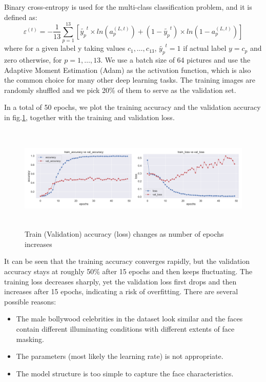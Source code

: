 Binary cross-entropy is used for the multi-class classification problem, and it is defined as:
\begin{equation}
    \varepsilon^{(t)} = -\frac{1}{13}\sum_{p=1}^{13}\left[  \tilde{y_p}^{t} \times ln(a_p^{(L,t)}) + (1-\tilde{y_p}^{t}) \times ln(1-a_p^{(L,t)}) \right]
\end{equation}
where for a given label y taking values $c_1,\dots, c_{13}$, $\tilde{y_p}^{t}=1$ if actual label $y=c_p$ and zero otherwise, for $p=1,\dots , 13$. We use a batch size of 64 pictures and use the Adaptive Moment Estimation (Adam) as the activation function, which is also the common choice for many other deep learning tasks. The training images are randomly shuffled and we pick 20\% of them to serve as the validation set.

In a total of 50 epochs, we plot the training accuracy and the validation accuracy in fig.\ref{pic:cnn1}, together with the training and validation loss. 
\begin{figure}[!htbp]
    \centering\includegraphics[width=16cm, height=5cm]{./figures/cnn1.png}
    \caption{Train (Validation) accuracy (loss) changes as number of epochs increases}
    \label{pic:cnn1}
\end{figure}
It can be seen that the training accuracy converges rapidly, but the validation accuracy stays at roughly 50\% after 15 epochs and then keeps fluctuating. The training loss decreases sharply, yet the validation loss first drops and then increases after 15 epochs, indicating a risk of overfitting. There are several possible reasons:
\begin{itemize}
    \item The male bollywood celebrities in the dataset look similar and the faces contain different illuminating conditions with different extents of face masking.
    \item The parameters (most likely the learning rate) is not appropriate.
    \item The model structure is too simple to capture the face characteristics.
\end{itemize}

